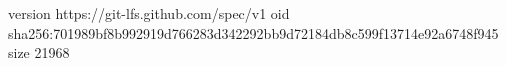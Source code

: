 version https://git-lfs.github.com/spec/v1
oid sha256:701989bf8b992919d766283d342292bb9d72184db8c599f13714e92a6748f945
size 21968
